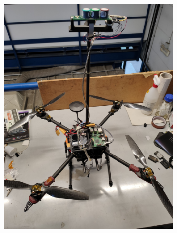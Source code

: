 \begin{figure}[!ht]
    \centering
    \begin{subfigure}[b]{0.45\textwidth}
        \centering
        \includegraphics[width=\textwidth, angle=-90]{images/drone/IMG_20211105_103832.jpg}
        \caption{}
        \label{fig:wide}
    \end{subfigure}
    \hfill
    \begin{subfigure}[b]{0.45\textwidth}
        \centering

\end{subfigure}
\end{figure}
